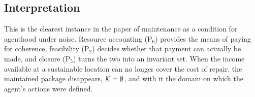 \subsection{Interpretation}
This is the clearest instance in the paper of maintenance as a condition for agenthood under noise. Resource accounting (P$_6$) provides the means of paying for coherence, feasibility (P$_2$) decides whether that payment can actually be made, and closure (P$_5$) turns the two into an invariant set. When the income available at a sustainable location can no longer cover the cost of repair, the maintained package disappears, $\mathcal{K}=\emptyset$, and with it the domain on which the agent's actions were defined.
